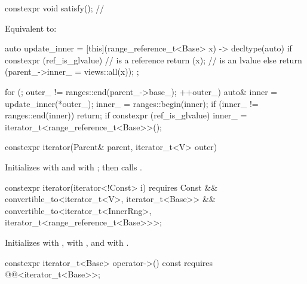 \begin{itemdecl}
constexpr void satisfy();       // \expos
\end{itemdecl}

\begin{itemdescr}
\pnum
\effects Equivalent to:
\begin{codeblock}
auto update_inner = [this](range_reference_t<Base> x) -> decltype(auto) {
  if constexpr (ref_is_glvalue) //  is a reference
    return (x);                 //  is an lvalue
  else
    return (parent_->inner_ = views::all(x));
};

for (; outer_ != ranges::end(parent_->base_); ++outer_) {
  auto& inner = update_inner(*outer_);
  inner_ = ranges::begin(inner);
  if (inner_ != ranges::end(inner))
    return;
}
if constexpr (ref_is_glvalue)
  inner_ = iterator_t<range_reference_t<Base>>();
\end{codeblock}
\end{itemdescr}

\begin{itemdecl}
constexpr iterator(Parent& parent, iterator_t<V> outer)
\end{itemdecl}

\begin{itemdescr}
\pnum
\effects Initializes  with  and
 with ; then calls .
\end{itemdescr}

\begin{itemdecl}
constexpr iterator(iterator<!Const> i)
  requires Const &&
           convertible_to<iterator_t<V>, iterator_t<Base>> &&
           convertible_to<iterator_t<InnerRng>,
                          iterator_t<range_reference_t<Base>>>;
\end{itemdecl}

\begin{itemdescr}
\pnum
\effects Initializes  with ,
 with , and
 with .
\end{itemdescr}

\begin{itemdecl}
constexpr iterator_t<Base> operator->() const
  requires @@<iterator_t<Base>>;
\end{itemdecl}

